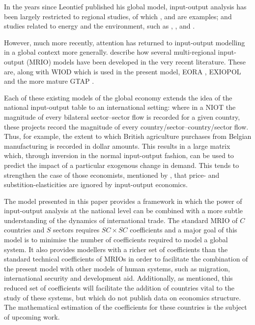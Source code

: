 \documentclass{article}
\begin{document}
In the years since Leontief published his global model, input-output analysis has been largely restricted to regional studies, of which \textcite{akita_interregional_1993}, \textcite{khan_sectoral_1999} and \textcite{luo_power--pull_2013} are examples; and studies related to energy and the environment, such as  \textcite{leontief_environmental_1970}, \textcite{joshi_product_1999}, \textcite{bergh_handbook_2002} and \textcite{hendrickson_environmental_2006}.

However, much more recently, attention has returned to input-output modelling in a global context more generally. \textcite{tukker_global_2013} describe how several multi-regional input-output (MRIO) models have been developed in the very recent literature.
These are, along with WIOD which is used in the present model, EORA \parencite{lenzen_building_2013}, EXIOPOL \parencite{tukker_exiopol_2013} and the more mature GTAP \parencite{walmsley_introduction_2012}.

Each of these existing models of the global economy extends the idea of the national input-output table to an international setting: where in a NIOT the magnitude of every bilateral sector--sector flow is recorded for a given country, these projects record the magnitude of every country/sector--country/sector flow.
Thus, for example, the extent to which British agriculture purchases from Belgian manufacturing is recorded in dollar amounts.
This results in a large matrix which, through inversion in the normal input-output fashion, can be used to predict the impact of a particular exogenous change in demand.
This tends to strengthen the case of those economists, mentioned by \textcite{duchin_international_2004}, that price- and substition-elasticities are ignored by input-output economics.

The model presented in this paper provides a framework in which the power of input-output analysis at the national level can be combined with a more subtle understanding of the dynamics of international trade.
The standard MRIO of $C$ countries and $S$ sectors requires $SC\times SC$ coefficients and a major goal of this model is to minimise the number of coefficients required to model a global system.
It also provides modellers with a richer set of coefficients than the standard technical coefficients of MRIOs in order to facilitate the combination of the present model with other models of human systems, such as migration, international security and development aid. 
Additionally, as mentioned, this reduced set of coefficients will facilitate the addition of countries vital to the study of these systems, but which do not publish data on economics structure.
The mathematical estimation of the coefficients for these countries is the subject of upcoming work.
\end{document}
